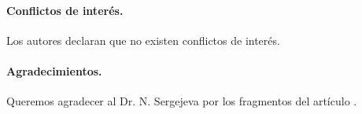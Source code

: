 \documentclass[a4paper, 10pt]{article}
\begin{document}
\paragraph{Conflictos de interés.} Los autores declaran que no existen conflictos de interés.

\paragraph{Agradecimientos.} Queremos agradecer al Dr. N. Sergejeva por los fragmentos del artículo \cite{2014SergejevaN}.



\end{document}
